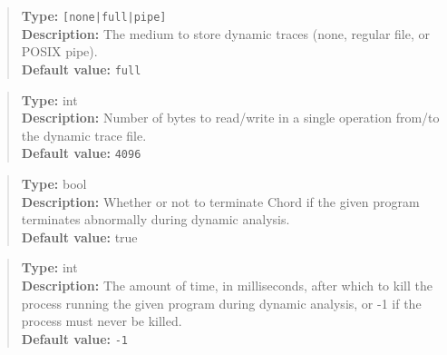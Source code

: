 \noindent {}
\begin{quote}
{\bf Type:} {\tt [none|full|pipe]}  \\
{\bf Description:} The medium to store dynamic traces (none, regular file, or POSIX pipe).  \\
{\bf Default value:} {\tt full}
\end{quote}

\noindent {}
\begin{quote}
{\bf Type:} int \\
{\bf Description:} Number of bytes to read/write in a single operation from/to the dynamic trace file. \\
{\bf Default value:} {\tt 4096}
\end{quote}

\noindent {}
\begin{quote}
{\bf Type:} bool \\
{\bf Description:} Whether or not to terminate Chord if the given program terminates abnormally during dynamic analysis. \\
{\bf Default value:} true
\end{quote}

\noindent {}
\begin{quote}
{\bf Type:} int  \\
{\bf Description:} The amount of time, in milliseconds, after which to kill the process running the given program during dynamic analysis, or -1 if the process must never be killed. \\
{\bf Default value:} {\tt -1}
\end{quote}


